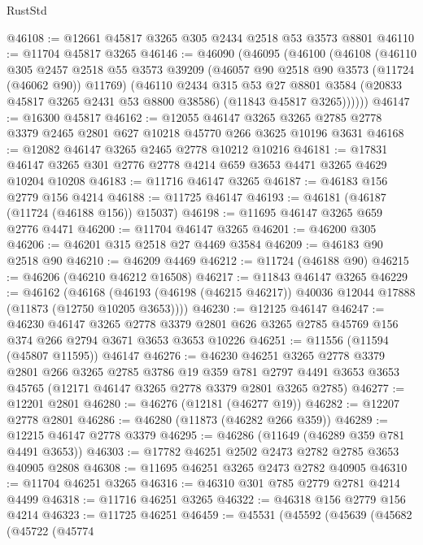 \begin{lexlean}{RustStd}
\begin{coremodule}
@46108 := @12661 @45817 @3265 @305 @2434 @2518 @53 @3573 @8801
@46110 := @11704 @45817 @3265
@46146 := @46090
    (@46095
      (@46100
        (@46108
          (@46110
            @305
            @2457
            @2518
            @55
            @3573
            @39209
            (@46057 @90 @2518 @90 @3573 (@11724 (@46062 @90)) @11769)
            (@46110
              @2434
              @315
              @53
              @27
              @8801
              @3584
              (@20833 @45817 @3265 @2431 @53 @8800 @38586)
              (@11843 @45817 @3265))))))
@46147 := @16300 @45817
@46162 := @12055
    @46147
    @3265
    @3265
    @2785
    @2778
    @3379
    @2465
    @2801
    @627
    @10218
    @45770
    @266
    @3625
    @10196
    @3631
@46168 := @12082 @46147 @3265 @2465 @2778 @10212 @10216
@46181 := @17831 @46147 @3265 @301 @2776 @2778 @4214 @659 @3653 @4471 @3265 @4629 @10204 @10208
@46183 := @11716 @46147 @3265
@46187 := @46183 @156 @2779 @156 @4214
@46188 := @11725 @46147
@46193 := @46181 (@46187 (@11724 (@46188 @156)) @15037)
@46198 := @11695 @46147 @3265 @659 @2776 @4471
@46200 := @11704 @46147 @3265
@46201 := @46200 @305
@46206 := @46201 @315 @2518 @27 @4469 @3584
@46209 := @46183 @90 @2518 @90
@46210 := @46209 @4469
@46212 := @11724 (@46188 @90)
@46215 := @46206 (@46210 @46212 @16508)
@46217 := @11843 @46147 @3265
@46229 := @46162
    (@46168 (@46193 (@46198 (@46215 @46217)) @40036 @12044 @17888 (@11873 (@12750 @10205 @3653))))
@46230 := @12125 @46147
@46247 := @46230
    @46147
    @3265
    @2778
    @3379
    @2801
    @626
    @3265
    @2785
    @45769
    @156
    @374
    @266
    @2794
    @3671
    @3653
    @3653
    @10226
@46251 := @11556 (@11594 (@45807 @11595)) @46147
@46276 := @46230
    @46251
    @3265
    @2778
    @3379
    @2801
    @266
    @3265
    @2785
    @3786
    @19
    @359
    @781
    @2797
    @4491
    @3653
    @3653
    @45765
    (@12171 @46147 @3265 @2778 @3379 @2801 @3265 @2785)
@46277 := @12201 @2801
@46280 := @46276 (@12181 (@46277 @19))
@46282 := @12207 @2778 @2801
@46286 := @46280 (@11873 (@46282 @266 @359))
@46289 := @12215 @46147 @2778 @3379
@46295 := @46286 (@11649 (@46289 @359 @781 @4491 @3653))
@46303 := @17782 @46251 @2502 @2473 @2782 @2785 @3653 @40905 @2808
@46308 := @11695 @46251 @3265 @2473 @2782 @40905
@46310 := @11704 @46251 @3265
@46316 := @46310 @301 @785 @2779 @2781 @4214 @4499
@46318 := @11716 @46251 @3265
@46322 := @46318 @156 @2779 @156 @4214
@46323 := @11725 @46251
@46459 := @45531
    (@45592
      (@45639
        (@45682
          (@45722
            (@45774

\end{coremodule}
\end{lexlean}
